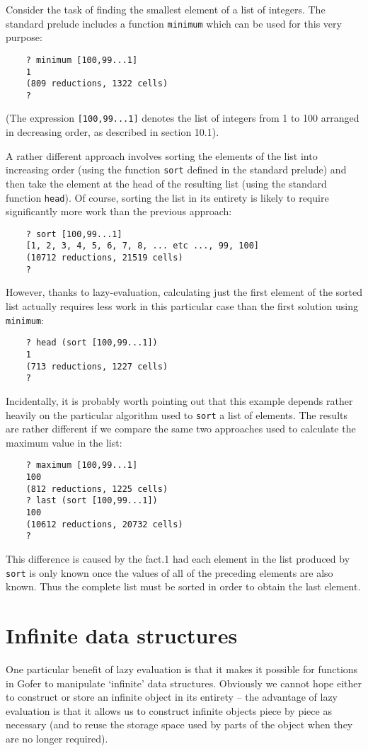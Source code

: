 Consider the task  of  finding  the  smallest  element  of  a  list  of
integers.  The standard prelude includes a function \verb"minimum" which can
be used for this very purpose:
\begin{verbatim}
    ? minimum [100,99...1]
    1
    (809 reductions, 1322 cells)
    ?
\end{verbatim}
(The expression \verb"[100,99...1]" denotes the list of integers from 1 to  100
arranged in decreasing order, as described in section 10.1).

A rather different approach involves sorting the elements of  the  list
into increasing  order  (using  the  function  \verb"sort"  defined  in  the
standard prelude) and  then  take  the  element  at  the  head  of  the
resulting list  (using  the  standard  function  \verb"head").   Of  course,
sorting the list in its entirety is  likely  to  require  significantly
more work than the previous approach:
\begin{verbatim}
    ? sort [100,99...1]
    [1, 2, 3, 4, 5, 6, 7, 8, ... etc ..., 99, 100]
    (10712 reductions, 21519 cells)
    ?
\end{verbatim}
However, thanks to lazy-evaluation, calculating just the first  element
of the sorted list actually requires less work in this particular  case
than the first solution using \verb"minimum":
\begin{verbatim}
    ? head (sort [100,99...1])
    1
    (713 reductions, 1227 cells)
    ?
\end{verbatim}
Incidentally, it is  probably worth  pointing  out  that  this  example
depends rather heavily on the particular algorithm  used  to  \verb"sort"  a
list of elements.  The results are rather different if we  compare  the
same two approaches used to calculate the maximum value in the list:
\begin{verbatim}
    ? maximum [100,99...1]
    100
    (812 reductions, 1225 cells)
    ? last (sort [100,99...1])
    100
    (10612 reductions, 20732 cells)
    ?
\end{verbatim}
This difference is caused by the fact.1 had each  element  in  the  list
produced by \verb"sort" is  only  known  once  the  values  of  all  of  the
preceding elements are also known.  Thus  the  complete  list  must  be
sorted in order to obtain the last element.


\section{Infinite data structures}
One particular benefit of lazy evaluation is that it makes it  possible
for functions  in  Gofer  to  manipulate  `infinite'  data  structures.
Obviously we cannot hope either to   construct  or  store  an  infinite
object in its entirety -- the advantage of lazy evaluation is  that  it
allows us to construct infinite objects piece  by  piece  as  necessary
(and to reuse the storage space used by parts of the object  when  they
are no longer required).

